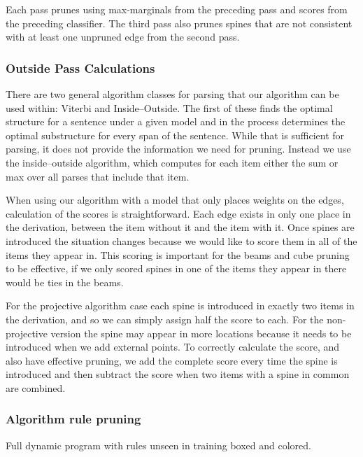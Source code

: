Each pass prunes using max-marginals from the preceding pass and scores from the preceding classifier.
The third pass also prunes spines that are not consistent with at least one unpruned edge from the second pass.


\subsubsection{Outside Pass Calculations}

There are two general algorithm classes for parsing that our algorithm can be used within: Viterbi and Inside--Outside.
The first of these finds the optimal structure for a sentence under a given model and in the process determines the optimal substructure for every span of the sentence.
While that is sufficient for parsing, it does not provide the information we need for pruning.
Instead we use the inside--outside algorithm, which computes for each item either the sum or max over all parses that include that item.

When using our algorithm with a model that only places weights on the edges, calculation of the scores is straightforward.
Each edge exists in only one place in the derivation, between the item without it and the item with it.
Once spines are introduced the situation changes because we would like to score them in all of the items they appear in.
This scoring is important for the beams and cube pruning to be effective, if we only scored spines in one of the items they appear in there would be ties in the beams.

For the projective algorithm case each spine is introduced in exactly two items in the derivation, and so we can simply assign half the score to each.
For the non-projective version the spine may appear in more locations because it needs to be introduced when we add external points.
To correctly calculate the score, and also have effective pruning, we add the complete score every time the spine is introduced and then subtract the score when two items with a spine in common are combined.

\subsubsection{Algorithm rule pruning}

\begin{algorithm}
\vspace{-2mm}

\vspace{-10mm}
\caption{\label{fig:rules-pruned}
Full dynamic program with rules unseen in training boxed and colored.
}
\end{algorithm}

